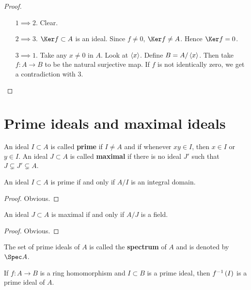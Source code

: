 \begin{proof}
\hfill
\begin{itemize}[leftmargin=0.5in]
\item[$ 1 \implies 2 $.] Clear.
\item[$ 2 \implies 3 $.] $ \Ker f \subset A $ is an ideal. Since $ f \ne 0 $, $ \Ker f \ne A $. Hence $ \Ker f = 0 $.
\item[$ 3 \implies 1 $.] Take any $ x \ne 0 $ in $ A $. Look at $ \left\langle x \right\rangle $. Define $ B = A / \left\langle x \right\rangle $. Then take $ f : A \to B $ to be the natural surjective map. If $ f $ is not identically zero, we get a contradiction with $ 3 $.
\end{itemize}
\end{proof}

\pagebreak

\section{Prime ideals and maximal ideals}

\begin{definition}
An ideal $ I \subset A $ is called \textbf{prime} if $ I \ne A $ and if whenever $ xy \in I $, then $ x \in I $ or $ y \in I $. An ideal $ J \subset A $ is called \textbf{maximal} if there is no ideal $ J' $ such that $ J \subsetneq J' \subsetneq A $.
\end{definition}

\begin{lemma}
An ideal $ I \subset A $ is prime if and only if $ A / I $ is an integral domain.
\end{lemma}

\begin{proof}
Obvious.
\end{proof}

\begin{lemma}
An ideal $ J \subset A $ is maximal if and only if $ A / J $ is a field.
\end{lemma}

\begin{proof}
Obvious.
\end{proof}

\begin{definition}
The set of prime ideals of $ A $ is called the \textbf{spectrum} of $ A $ and is denoted by $ \Spec A $.
\end{definition}

\begin{proposition}
If $ f : A \to B $ is a ring homomorphism and $ I \subset B $ is a prime ideal, then $ f^{-1}\br{I} $ is a prime ideal of $ A $.
\end{proposition}

